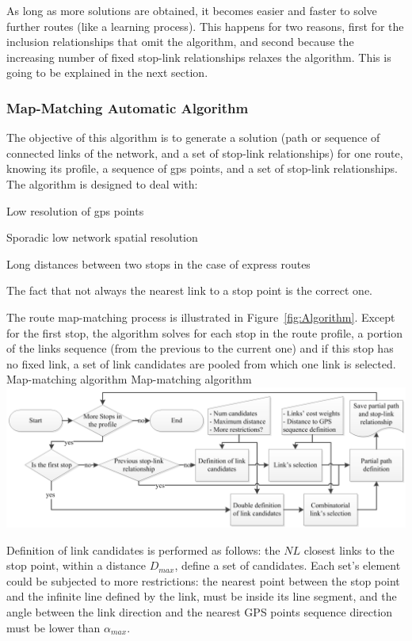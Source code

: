 As long as more solutions are obtained, it becomes easier and faster to solve further routes (like a learning process). This happens for two reasons, first for the inclusion relationships that omit the algorithm, and second because the increasing number of fixed stop-link relationships relaxes the algorithm. This is going to be explained in the next section.

\subsubsection{Map-Matching Automatic Algorithm}
The objective of this algorithm is to generate a solution (path or sequence of connected links of the network, and a set of stop-link relationships) for one route, knowing its profile, a sequence of \gls{gps} points, and a set of stop-link relationships. The algorithm is designed to deal with:
%
\begin{compactitem}
\item	Low resolution of \gls{gps} points
\item	Sporadic low network spatial resolution
\item	Long distances between two stops in the case of express routes
\item	The fact that not always the nearest link to a stop point is the correct one.
\end{compactitem}

The route map-matching process is illustrated in Figure~\ref{fig:Algorithm}. Except for the first stop, the algorithm solves for each stop in the route profile, a portion of the links sequence (from the previous to the current one) and if this stop has no fixed link, a set of link candidates are pooled from which one link is selected.
%
\createfigure
{Map-matching algorithm}
{Map-matching algorithm}
{\label{fig:Algorithm}}
{\includegraphics[width=1.0\textwidth]{extending/figures/semiAuto/Algorithm.png}}
{}

Definition of link candidates is performed as follows: the $NL$ closest links to the stop point, within a distance $D_{max}$, define a set of candidates. Each set's element could be subjected to more restrictions: the nearest point between the stop point and the infinite line defined by the link, must be inside its line segment, and the angle between the link direction and the nearest GPS points sequence direction must be lower than $\alpha_{max}$.

